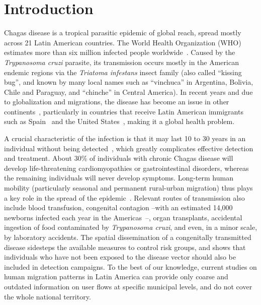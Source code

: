
\chapter{Introduction}\label{ch:introduction}


Chagas disease is a tropical parasitic epidemic of global reach, spread mostly across 21 Latin American countries. The World Health Organization (WHO) estimates more than six million infected people worldwide~\cite{who2016}. Caused by the \textit{Trypanosoma cruzi} parasite, its transmission occurs mostly in the American endemic regions via the \textit{Triatoma infestans} insect family (also called ``kissing bug'', and known by many local names such as ``vinchuca'' in Argentina, Bolivia, Chile and Paraguay, and ``chinche'' in Central America). In recent years and due to globalization and migrations, the disease has become an %
issue in other continents~\cite{schmunis2010chagas},
particularly in countries that receive Latin American immigrants such as Spain~\cite{navarro2012chagas} and the United States~\cite{hotez2013unfolding},
making it a global health problem.


A crucial characteristic of the infection is that it may last 10 to 30 years in an individual without being detected~\cite{rassi2012american}, which greatly complicates effective detection and treatment. About 30\% of individuals with chronic Chagas disease will develop life-threatening cardiomyopathies or gastrointestinal disorders, whereas
the remaining individuals will never develop symptoms.
Long-term human mobility (particularly seasonal and permanent rural-urban migration) thus plays a key role in the spread of the epidemic~\cite{briceno2009chagas}. Relevant routes of transmission also include blood transfusion, congenital contagion --with an estimated 14,000 newborns infected each year in the Americas~\cite{OPS2006chagas}--,
organ transplants,
accidental ingestion of food contaminated by \textit{Trypanosoma cruzi}, and even, in a minor scale,
by laboratory accidents.
The spatial dissemination of a congenitally transmitted disease sidesteps the available measures to control risk groups, and shows that individuals who have not been exposed to the disease vector should also be included in detection campaigns.
To the best of our knowledge, current studies on human migration patterns in Latin America can provide only coarse and outdated information on user flows at specific municipal levels, and do not cover the whole national territory.

